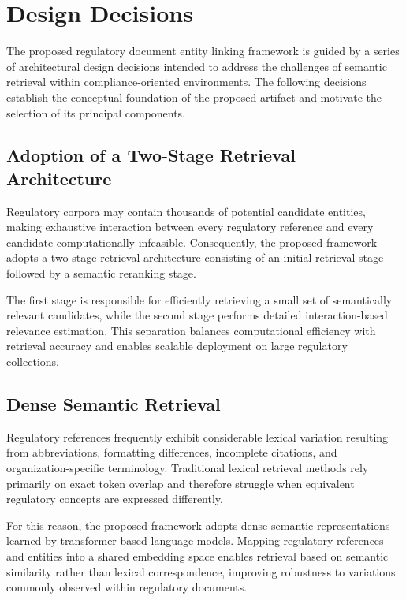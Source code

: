 \section{Design Decisions}

The proposed regulatory document entity linking framework is guided by a series of architectural design decisions intended to address the challenges of semantic retrieval within compliance-oriented environments. The following decisions establish the conceptual foundation of the proposed artifact and motivate the selection of its principal components.

\subsection{Adoption of a Two-Stage Retrieval Architecture}

Regulatory corpora may contain thousands of potential candidate entities, making exhaustive interaction between every regulatory reference and every candidate computationally infeasible. Consequently, the proposed framework adopts a two-stage retrieval architecture consisting of an initial retrieval stage followed by a semantic reranking stage.

The first stage is responsible for efficiently retrieving a small set of semantically relevant candidates, while the second stage performs detailed interaction-based relevance estimation. This separation balances computational efficiency with retrieval accuracy and enables scalable deployment on large regulatory collections.

\subsection{Dense Semantic Retrieval}

Regulatory references frequently exhibit considerable lexical variation resulting from abbreviations, formatting differences, incomplete citations, and organization-specific terminology. Traditional lexical retrieval methods rely primarily on exact token overlap and therefore struggle when equivalent regulatory concepts are expressed differently.

For this reason, the proposed framework adopts dense semantic representations learned by transformer-based language models. Mapping regulatory references and entities into a shared embedding space enables retrieval based on semantic similarity rather than lexical correspondence, improving robustness to variations commonly observed within regulatory documents.

